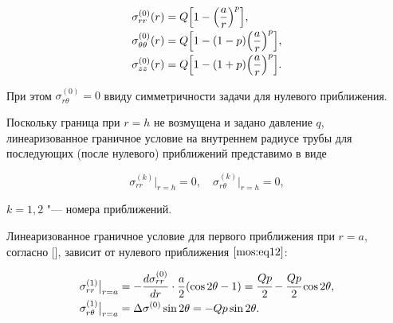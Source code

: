 \begin{equation}

\label{mos:eq12}

\begin{array}{l}

\displaystyle

 \sigma^{(0)}_{rr}(r)=Q \Bigl[ 1-\Bigl(\frac{a}{r}\Bigr)^{p}\Bigr],

 \\[2mm]

\displaystyle

 \sigma^{(0)}_{\theta\theta}(r)=Q \Bigl[ 1-(1-p)\Bigl(\frac{a}{r}\Bigr)^{p}\Bigr],

 \\[2mm] \displaystyle

 \sigma^{(0)}_{zz}(r)=Q \Bigl[ 1-(1+p)\Bigl(\frac{a}{r}\Bigr)^{p}\Bigr].

\end{array}

\end{equation}

При этом $\sigma^{(0)}_{r \theta}=0$ ввиду симметричности задачи для нулевого приближения.



Поскольку граница при $r=h$ не возмущена и задано давление $q$, линеаризованное граничное условие на внутреннем радиусе трубы для последующих (после нулевого)  приближений представимо в виде

\begin{equation}

\label{mos:eq13}

\displaystyle

\sigma_{rr}^{(k)}\big|_{r=h}=0, \quad \sigma_{r \theta}^{(k)}\big|_{r=h}=0,

\end{equation}

$k=1, 2$ "--- номера приближений.



Линеаризованное граничное условие для первого приближения при $r=a$, согласно [], зависит от нулевого приближения $\eqref{mos:eq12}$:

\begin{equation}

\label{mos:eq14}

\begin{array}{l}

\displaystyle

 \sigma_{rr}^{(1)}\big|_{r=a}=-\frac{d\sigma_{rr}^{(0)}}{dr}\cdot\frac a2(\cos{2\theta}-1)=\cfrac{Qp}{2}-\cfrac{Qp}{2}\cos{2\theta}, \\[2mm]

\displaystyle  

\sigma_{r \theta}^{(1)}\big|_{r=a}=\Delta \sigma^{(0)}\sin{2\theta}=-Qp\sin{2\theta}.

\end{array}

\end{equation}



